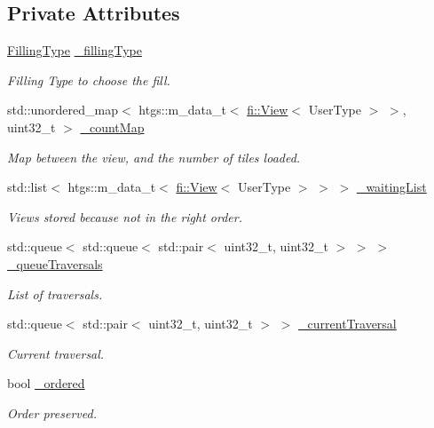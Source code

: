 \subsection*{Private Attributes}
\begin{DoxyCompactItemize}
\item 
\hyperlink{namespacefi_a6808b618c85d179a330ca388162215bd}{Filling\+Type} \hyperlink{classfi_1_1ViewCounter_a1b73e5b8d05eeaec0ff50ae5f53fb405}{\+\_\+filling\+Type}
\begin{DoxyCompactList}\small\item\em Filling Type to choose the fill. \end{DoxyCompactList}\item 
std\+::unordered\+\_\+map$<$ htgs\+::m\+\_\+data\+\_\+t$<$ \hyperlink{classfi_1_1View}{fi\+::\+View}$<$ User\+Type $>$ $>$, uint32\+\_\+t $>$ \hyperlink{classfi_1_1ViewCounter_ad37ec893e7e014bab185105eaf0ce65a}{\+\_\+count\+Map}
\begin{DoxyCompactList}\small\item\em Map between the view, and the number of tiles loaded. \end{DoxyCompactList}\item 
std\+::list$<$ htgs\+::m\+\_\+data\+\_\+t$<$ \hyperlink{classfi_1_1View}{fi\+::\+View}$<$ User\+Type $>$ $>$ $>$ \hyperlink{classfi_1_1ViewCounter_af3ee501d1562ebca98353a4dd68ea3c5}{\+\_\+waiting\+List}
\begin{DoxyCompactList}\small\item\em Views stored because not in the right order. \end{DoxyCompactList}\item 
std\+::queue$<$ std\+::queue$<$ std\+::pair$<$ uint32\+\_\+t, uint32\+\_\+t $>$ $>$ $>$ \hyperlink{classfi_1_1ViewCounter_a1f03f92f9e6d2c0db314faa1b70459b2}{\+\_\+queue\+Traversals}
\begin{DoxyCompactList}\small\item\em List of traversals. \end{DoxyCompactList}\item 
std\+::queue$<$ std\+::pair$<$ uint32\+\_\+t, uint32\+\_\+t $>$ $>$ \hyperlink{classfi_1_1ViewCounter_acb9cacb70afa4c4d2de4ad572042b76d}{\+\_\+current\+Traversal}
\begin{DoxyCompactList}\small\item\em Current traversal. \end{DoxyCompactList}\item 
bool \hyperlink{classfi_1_1ViewCounter_a0dfcb4d800a0d80591e4e6d34b148731}{\+\_\+ordered}
\begin{DoxyCompactList}\small\item\em Order preserved. \end{DoxyCompactList}\end{DoxyCompactItemize}


